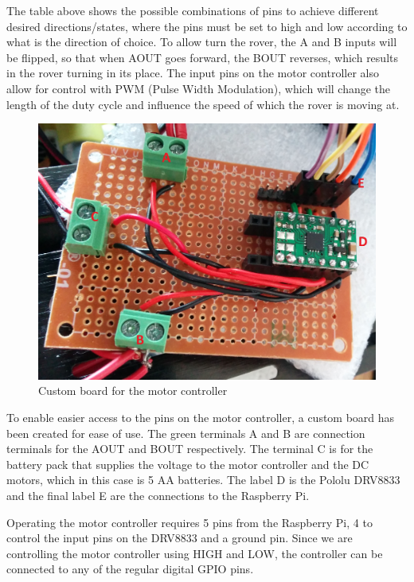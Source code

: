 The table above shows the possible combinations of pins to achieve different desired directions/states, where the pins must be set to high and low according to what is the direction of choice. To allow turn the rover, the A and B inputs will be flipped, so that when AOUT goes forward, the BOUT reverses, which results in the rover turning in its place.
The input pins on the motor controller also allow for control with PWM (Pulse Width Modulation), which will change the length of the duty cycle and influence the speed of which the rover is moving at\cite{DRV8833}.

\begin{figure}[H]
	\centering
	\includegraphics[width=.5\linewidth]{images/labelled.jpg}
	\caption{Custom board for the motor controller}
	\label{customboardmc}	
\end{figure}

To enable easier access to the pins on the motor controller, a custom board has been created for ease of use. The green terminals A and B are connection terminals for the AOUT and BOUT respectively. The terminal C is for the battery pack that supplies the voltage to the motor controller and the DC motors, which in this case is 5 AA batteries. The label D is the Pololu DRV8833 and the final label E are the connections to the Raspberry Pi. 

Operating the motor controller requires 5 pins from the Raspberry Pi, 4 to control the input pins on the DRV8833 and a ground pin. Since we are controlling the motor controller using HIGH and LOW, the controller can be connected to any of the regular digital GPIO pins.